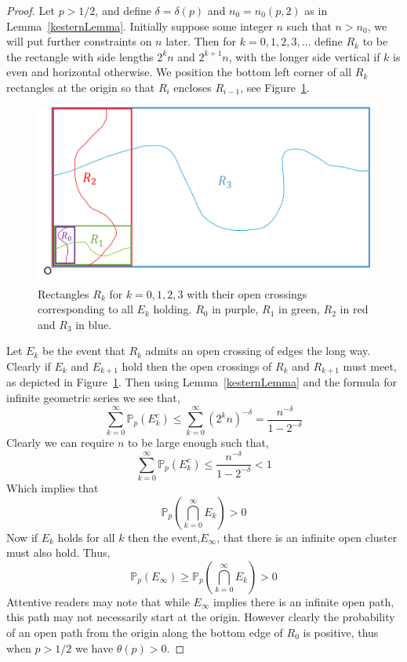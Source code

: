 \documentclass[a4paper,11pt]{article}
\theoremstyle{definition}
\newcommand{\prob}{\mathbb{P}_p}
\begin{document}
\begin{proof}
	Let $p >1/2$, and define $\delta = \delta(p)$ and $n_0 = n_0(p,2)$ as in Lemma~\ref*{kesternLemma}. Initially suppose some integer $n$ such that $n > n_0$, we will put further constraints on $n$ later. Then for $k = 0,1,2,3,...$ define $R_k$ to be the rectangle with side lengths $2^{k}n$ and $2^{k+1}n$, with the longer side vertical if $k$ is even and horizontal otherwise. We position the bottom left corner of all $R_k$ rectangles at the origin so that $R_i$ encloses $R_{i-1}$, see Figure~\ref*{fig:KesternRectangle}.

	\begin{figure}
		\centering
		\includegraphics[scale=0.58]{drawings/kestenRectangles.png}
		\caption{Rectangles $R_k$ for $k=0,1,2,3$ with their open crossings corresponding to all $E_k$ holding. $R_0$ in purple, $R_1$ in green, $R_2$ in red and $R_3$ in blue.}
		\label{fig:KesternRectangle}
	\end{figure}

	Let $E_k$ be the event that $R_k$ admits an open crossing of edges the long way. Clearly if $E_k$ and $E_{k+1}$ hold then the open crossings of $R_k$ and $R_{k+1}$ must meet, as depicted in Figure~\ref*{fig:KesternRectangle}. Then using Lemma~\ref*{kesternLemma} and the formula for infinite geometric series we see that,
	$$\sum_{k=0}^{\infty}\prob(E^c_k) \leq \sum_{k=0}^{\infty}(2^kn)^{-\delta} = \frac{n^{-\delta}}{1-2^{-\delta}}$$
	Clearly we can require $n$ to be large enough such that,
	$$\sum_{k=0}^{\infty}\prob(E^c_k) \leq  \frac{n^{-\delta}}{1-2^{-\delta}} < 1$$
	Which implies that $$\prob\left(\bigcap_{k=0}^{\infty}E_k\right)>0$$
	Now if $E_k$ holds for all $k$ then the event,$E_{\infty}$, that there is an infinite open cluster must also hold. Thus,
	$$\prob(E_{\infty}) \geq \prob\left(\bigcap_{k=0}^{\infty}E_k\right)>0$$
	Attentive readers may note that while $E_{\infty}$ implies there is an infinite open path, this path may not necessarily start at the origin. However clearly the probability of an open path from the origin along the bottom edge of $R_0$ is positive, thus when $p>1/2$ we have $\theta(p) >0$. 

\end{proof}
\end{document}
